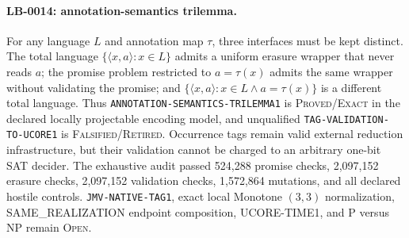 \paragraph{LB-0014: annotation-semantics trilemma.}
For any language $L$ and annotation map $\tau$, three interfaces must be kept
distinct.  The total language $\{\langle x,a\rangle:x\in L\}$ admits a
uniform erasure wrapper that never reads $a$; the promise problem restricted
to $a=\tau(x)$ admits the same wrapper without validating the promise; and
$\{\langle x,a\rangle:x\in L\wedge a=\tau(x)\}$ is a different total
language.  Thus \texttt{ANNOTATION-SEMANTICS-TRILEMMA1} is
\textsc{Proved/Exact} in the declared locally projectable encoding model, and
unqualified \texttt{TAG-VALIDATION-TO-UCORE1} is
\textsc{Falsified/Retired}.  Occurrence tags remain valid external reduction
infrastructure, but their validation cannot be charged to an arbitrary
one-bit SAT decider.  The exhaustive audit passed 524,288 promise checks,
2,097,152 erasure checks, 2,097,152 validation checks, 1,572,864 mutations,
and all declared hostile controls.  \texttt{JMV-NATIVE-TAG1}, exact local
Monotone $(3,3)$ normalization, SAME\_REALIZATION endpoint composition,
UCORE-TIME1, and P versus NP remain \textsc{Open}.

